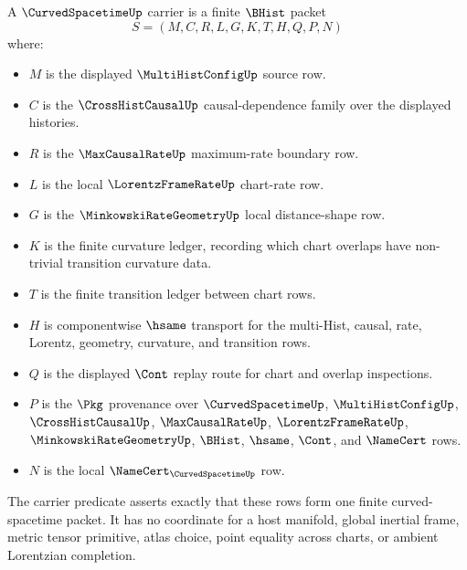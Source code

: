 \begin{definition}
\label{def:curved-spacetime-carrier}
A $\CurvedSpacetimeUp$ carrier is a finite $\BHist$ packet
$$
S=(M,C,R,L,G,K,T,H,Q,P,N)
$$
where:
\begin{itemize}
\item $M$ is the displayed $\MultiHistConfigUp$ source row.
\item $C$ is the $\CrossHistCausalUp$ causal-dependence family over the displayed histories.
\item $R$ is the $\MaxCausalRateUp$ maximum-rate boundary row.
\item $L$ is the local $\LorentzFrameRateUp$ chart-rate row.
\item $G$ is the $\MinkowskiRateGeometryUp$ local distance-shape row.
\item $K$ is the finite curvature ledger, recording which chart overlaps have non-trivial transition curvature data.
\item $T$ is the finite transition ledger between chart rows.
\item $H$ is componentwise $\hsame$ transport for the multi-Hist, causal, rate, Lorentz, geometry, curvature, and transition rows.
\item $Q$ is the displayed $\Cont$ replay route for chart and overlap inspections.
\item $P$ is the $\Pkg$ provenance over $\CurvedSpacetimeUp$, $\MultiHistConfigUp$, $\CrossHistCausalUp$, $\MaxCausalRateUp$, $\LorentzFrameRateUp$, $\MinkowskiRateGeometryUp$, $\BHist$, $\hsame$, $\Cont$, and $\NameCert$ rows.
\item $N$ is the local $\NameCert_{\CurvedSpacetimeUp}$ row.
\end{itemize}
The carrier predicate asserts exactly that these rows form one finite curved-spacetime packet. It has no coordinate for a host manifold, global inertial frame, metric tensor primitive, atlas choice, point equality across charts, or ambient Lorentzian completion.
\end{definition}

